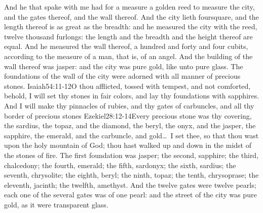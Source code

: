 And he that spake with me had for a measure a golden reed to measure the city, and the gates thereof, and the wall thereof.%
And the city lieth foursquare, and the length thereof is as great as the breadth:%
and he measured the city with the reed, twelve thousand furlongs: the length and the breadth and the height thereof are equal.%
And he measured the wall thereof, a hundred and forty and four cubits, according to the measure of a man, that is, of an angel. 
And the building of the wall thereof was jasper: and the city was pure gold, like unto pure glass. 
The foundations of the wall of the city were adorned with all manner of precious stones.%
				{Isaiah}{54:11-12}{O thou afflicted, tossed with tempest, and not comforted, behold, I will set thy stones in fair colors, and lay thy foundations with sapphires. And I will make thy pinnacles of rubies, and thy gates of carbuncles, and all thy border of precious stones}%
				{Ezekiel}{28:12-14}{Every precious stone was thy covering, the sardius, the topaz, and the diamond, the beryl, the onyx, and the jasper, the sapphire, the emerald, and the carbuncle, and gold\ldots\ I set thee, so that thou wast upon the holy mountain of God; thou hast walked up and down in the midst of the stones of fire.} %
 The first foundation was jasper; the second, sapphire; the third, chalcedony; the fourth, emerald; 
the fifth, sardonyx; the sixth, sardius; the seventh, chrysolite; the eighth, beryl; the ninth, topaz; the tenth, chrysoprase; the eleventh, jacinth; the twelfth, amethyst. 
 And the twelve gates were twelve pearls; each one of the several gates was of one pearl: and the street of the city was pure gold, as it were transparent glass. 

